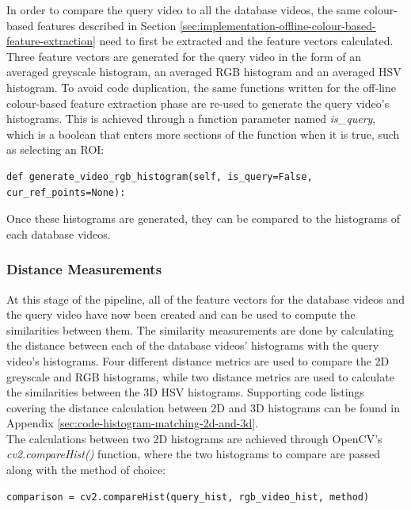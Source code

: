 In order to compare the query video to all the database videos, the same colour-based features described in Section \ref{sec:implementation-offline-colour-based-feature-extraction} need to first be extracted and the feature vectors calculated. Three feature vectors are generated for the query video in the form of an averaged greyscale histogram, an averaged RGB histogram and an averaged HSV histogram. To avoid code duplication, the same functions written for the off-line colour-based feature extraction phase are re-used to generate the query video's histograms. This is achieved through a function parameter named \textit{is\_query}, which is a boolean that enters more sections of the function when it is true, such as selecting an ROI:

\begin{lstlisting}[numbers=none]
def generate_video_rgb_histogram(self, is_query=False, cur_ref_points=None):
\end{lstlisting}

Once these histograms are generated, they can be compared to the histograms of each database videos.

\subsubsection{Distance Measurements}
\label{sec:implementation-distance-measurements}

At this stage of the pipeline, all of the feature vectors for the database videos and the query video have now been created and can be used to compute the similarities between them. The similarity measurements are done by calculating the distance between each of the database videos' histograms with the query video's histograms. Four different distance metrics are used to compare the 2D greyscale and RGB histograms, while two distance metrics are used to calculate the similarities between the 3D HSV histograms. Supporting code listings covering the distance calculation between 2D and 3D histograms can be found in Appendix \ref{sec:code-histogram-matching-2d-and-3d}.\\

The calculations between two 2D histograms are achieved through OpenCV's \textit{cv2.compareHist()} function, where the two histograms to compare are passed along with the method of choice:

\begin{lstlisting}[numbers=none]
comparison = cv2.compareHist(query_hist, rgb_video_hist, method)
\end{lstlisting}

